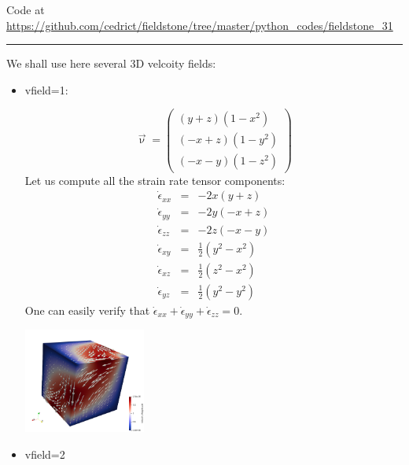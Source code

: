 

\begin{center}
Code at \url{https://github.com/cedrict/fieldstone/tree/master/python_codes/fieldstone_31}
\end{center}

\par\noindent\rule{\textwidth}{0.4pt}


We shall use here several 3D velcoity fields:

\begin{itemize}

\item vfield=1:

\begin{equation}
\vec{\upnu}
=
\left(
\begin{array}{c}
(y+z)(1-x^2) \\
(-x+z)(1-y^2) \\
(-x-y)(1-z^2) 
\end{array}
\right)
\end{equation}
Let us compute all the strain rate tensor components:
\begin{eqnarray}
\dot{\epsilon}_{xx}&=& -2x(y+z)  \nonumber\\
\dot{\epsilon}_{yy}&=& -2y(-x+z) \nonumber\\
\dot{\epsilon}_{zz}&=& -2z(-x-y) \nonumber\\
\dot{\epsilon}_{xy}&=& \frac{1}{2}(y^2-x^2) \nonumber\\ 
\dot{\epsilon}_{xz}&=& \frac{1}{2}(z^2-x^2)  \nonumber\\
\dot{\epsilon}_{yz}&=& \frac{1}{2}(y^2-y^2)  \nonumber
\end{eqnarray}
One can easily verify that $\dot{\epsilon}_{xx} +\dot{\epsilon}_{yy} +\dot{\epsilon}_{zz}=0$.

\includegraphics[width=4cm]{python_codes/fieldstone_31/velfield1}

\item vfield=2


\end{itemize}
